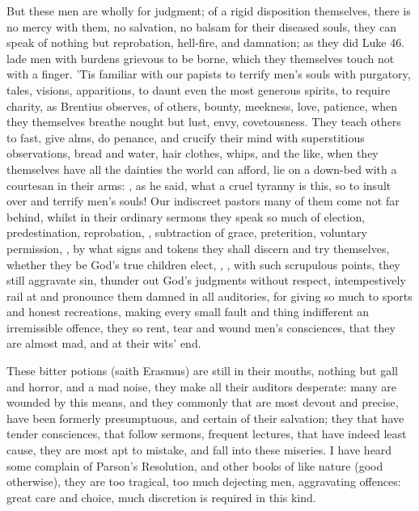 {But these men are wholly for judgment; of a rigid disposition
themselves, there is no mercy with them, no salvation, no balsam for
their diseased souls, they can speak of nothing but reprobation,
hell-fire, and damnation; as they did Luke  46. lade men with
burdens grievous to be borne, which they themselves touch not with a
finger. 'Tis familiar with our papists to terrify men's souls with
purgatory, tales, visions, apparitions, to daunt even the most generous
spirits, to require charity, as Brentius observes, of others,
bounty, meekness, love, patience, when they themselves breathe nought
but lust, envy, covetousness. They teach others to fast, give alms, do
penance, and crucify their mind with superstitious observations, bread
and water, hair clothes, whips, and the like, when they themselves have
all the dainties the world can afford, lie on a down-bed with a
courtesan in their arms: , as he
said, what a cruel tyranny is this, so to insult over and terrify men's
souls! Our indiscreet pastors many of them come not far behind, whilst
in their ordinary sermons they speak so much of election,
predestination, reprobation, , subtraction of grace,
preterition, voluntary permission, \etc{}, by what signs and tokens they
shall discern and try themselves, whether they be God's true children
elect, , \etc{}, with such scrupulous
points, they still aggravate sin, thunder out God's judgments without
respect, intempestively rail at and pronounce them damned in all
auditories, for giving so much to sports and honest recreations, making
every small fault and thing indifferent an irremissible offence, they
so rent, tear and wound men's consciences, that they are almost mad,
and at their wits' end.

These bitter potions (saith Erasmus) are still in their mouths,
nothing but gall and horror, and a mad noise, they make all their
auditors desperate: many are wounded by this means, and they commonly
that are most devout and precise, have been formerly presumptuous, and
certain of their salvation; they that have tender consciences, that
follow sermons, frequent lectures, that have indeed least cause, they
are most apt to mistake, and fall into these miseries. I have heard
some complain of Parson's Resolution, and other books of like nature
(good otherwise), they are too tragical, too much dejecting men,
aggravating offences: great care and choice, much discretion is
required in this kind.

}
